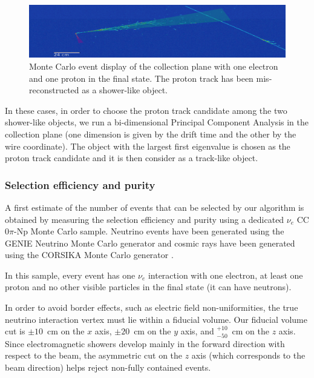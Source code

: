 \begin{figure}[htbp]
	\begin{center}
    	\includegraphics[width=0.8\linewidth]{figures/2showers.png}
    	\caption{Monte Carlo event display of the collection plane with one electron and one proton in the final state. The proton track has been mis-reconstructed as a shower-like object.} \label{fig:2showers}
	\end{center}
\end{figure}

In these cases, in order to choose the proton track candidate among the two shower-like objects, we run a bi-dimensional Principal Component Analysis in the collection plane (one dimension is given by the drift time and the other by the wire coordinate). The object with the largest first eigenvalue is chosen as the proton track candidate and it is then consider as a track-like object.

\subsubsection{Selection efficiency and purity}\label{sec:eff}
A first estimate of the number of events that can be selected by our algorithm is obtained by measuring the selection efficiency and purity using a dedicated $\nu_{e}$ CC$0\pi$-Np Monte Carlo sample. Neutrino events have been generated using the GENIE Neutrino Monte Carlo generator \cite{genie} and cosmic rays have been generated using the CORSIKA Monte Carlo generator \cite{corsika}. 

In this sample, every event has one $\nu_{e}$ interaction with one electron, at least one proton and no other visible particles in the final state (it can have neutrons). 

In order to avoid border effects, such as electric field non-uniformities, the true neutrino interaction vertex must lie within a fiducial volume. Our fiducial volume cut is $\pm10$~cm on the $x$ axis, $\pm20$~cm on the $y$ axis, and $^{+10}_{-50}$~cm on the $z$ axis. 
Since electromagnetic showers develop mainly in the forward direction with respect to the beam, the asymmetric cut on the $z$ axis (which corresponds to the beam direction) helps reject non-fully contained events.

